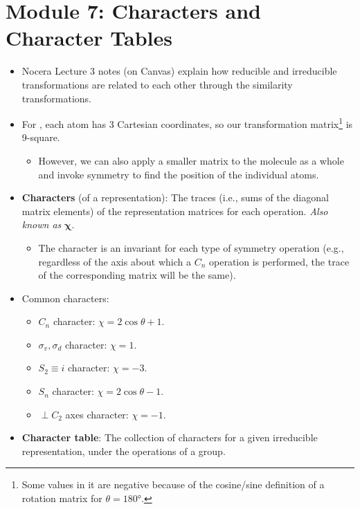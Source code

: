\documentclass[../notes.tex]{subfiles}
\begin{document}
\section{Module 7: Characters and Character Tables}
\begin{itemize}
    \item {}Nocera Lecture 3 notes (on Canvas) explain how reducible and irreducible transformations are related to each other through the similarity transformations.
    \item For , each atom has 3 Cartesian coordinates, so our transformation matrix\footnote{Some values in it are negative because of the cosine/sine definition of a rotation matrix for $\theta=\ang{180}$.} is 9-square.
    \begin{itemize}
        \item However, we can also apply a smaller matrix to the molecule as a whole and invoke symmetry to find the position of the individual atoms.
    \end{itemize}
    \item \textbf{Characters} (of a representation): The traces (i.e., sums of the diagonal matrix elements) of the representation matrices for each operation. \emph{Also known as} $\bm{\chi}$.
    \begin{itemize}
        \item The character is an invariant for each type of symmetry operation (e.g., regardless of the axis about which a $C_n$ operation is performed, the trace of the corresponding matrix will be the same).
    \end{itemize}
    \item Common characters:
    \begin{itemize}
        \item $C_n$ character: $\chi=2\cos\theta+1$.
        \item $\sigma_v,\sigma_d$ character: $\chi=1$.
        \item $S_2\equiv i$ character: $\chi=-3$.
        \item $S_n$ character: $\chi=2\cos\theta-1$.
        \item $\perp C_2$ axes character: $\chi=-1$.
    \end{itemize}
    \item \textbf{Character table}: The collection of characters for a given irreducible representation, under the operations of a group.
    \begin{figure}[h!]
        \centering
        \renewcommand{\arraystretch}{1.2}

\end{figure}
\end{itemize}
\end{document}
